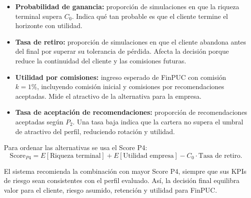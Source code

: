 \begin{itemize}
    \item \textbf{Probabilidad de ganancia:} proporci\'on de simulaciones en
    que la riqueza terminal supera $C_0$. Indica qu\'e tan probable es que el
    cliente termine el horizonte con utilidad.

    \item \textbf{Tasa de retiro:} proporci\'on de simulaciones en que el
    cliente abandona antes del final por superar su tolerancia de p\'erdida.
    Afecta la decisi\'on porque reduce la continuidad del cliente y las
    comisiones futuras.

    \item \textbf{Utilidad por comisiones:} ingreso esperado de FinPUC con
    comisi\'on $k = 1\%$, incluyendo comisi\'on inicial y comisiones por
    recomendaciones aceptadas. Mide el atractivo de la alternativa para la
    empresa.

    \item \textbf{Tasa de aceptaci\'on de recomendaciones:} proporci\'on de
    recomendaciones aceptadas seg\'un $P_2$. Una tasa baja indica que la cartera
    no supera el umbral de atractivo del perfil, reduciendo rotaci\'on y utilidad.
\end{itemize}

Para ordenar las alternativas se usa el Score P4:
\begin{equation}
\text{Score}_{P4} =
E[\text{Riqueza terminal}]
+ E[\text{Utilidad empresa}]
- C_0 \cdot \text{Tasa de retiro}.
\end{equation}

El sistema recomienda la combinaci\'on con mayor Score P4, siempre que sus
KPIs de riesgo sean consistentes con el perfil evaluado. As\'i, la decisi\'on
final equilibra valor para el cliente, riesgo asumido, retenci\'on y utilidad
para FinPUC.
